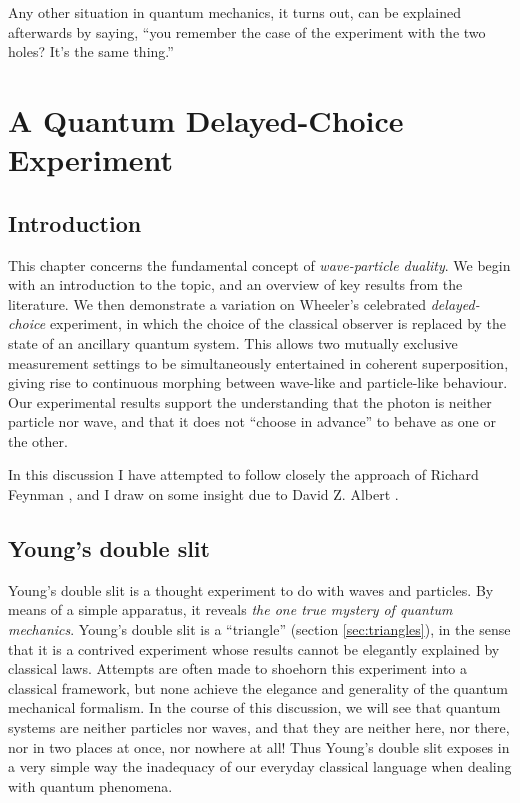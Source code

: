 \begin{savequote}[100mm] 
Any other situation in quantum mechanics, it turns out, can be explained afterwards by saying, ``you remember the case of the experiment with the two holes? It's the same thing.'' 
\end{savequote}

\chapter{A Quantum Delayed-Choice Experiment}
\label{chap:delayed-choice}

\section{Introduction} 
This chapter concerns the fundamental concept of \emph{wave-particle duality}. We begin with an introduction to the topic, and an overview of key results from the literature. We then demonstrate a variation on Wheeler's celebrated \emph{delayed-choice} experiment, in which the choice of the classical observer is replaced by the state of an ancillary quantum system. This allows two mutually exclusive measurement settings to be simultaneously entertained in coherent superposition, giving rise to continuous morphing between wave-like and particle-like behaviour. Our experimental results support the understanding that the photon is neither particle nor wave, and that it does not ``choose in advance'' to behave as one or the other. 

In this discussion I have attempted to follow closely the approach of Richard Feynman \cite{Feynman1963}, and I draw on some insight due to David Z. Albert \cite{Albert1994}.

\section{Young's double slit} 
\label{sec:young-double-slit}
Young's double slit is a thought experiment to do with waves and particles. By means of a simple apparatus, it reveals \emph{the one true mystery of quantum mechanics}. Young's double slit is a ``triangle'' (section \ref{sec:triangles}), in the sense that it is a contrived experiment whose results cannot be elegantly explained by classical laws. Attempts are often made to shoehorn this experiment into a classical framework, but none achieve the elegance and generality of the quantum mechanical formalism. In the course of this discussion, we will see that quantum systems are neither particles nor waves, and that they are neither here, nor there, nor in two places at once, nor nowhere at all! Thus Young's double slit exposes in a very simple way the inadequacy of our everyday classical language when dealing with quantum phenomena. 


